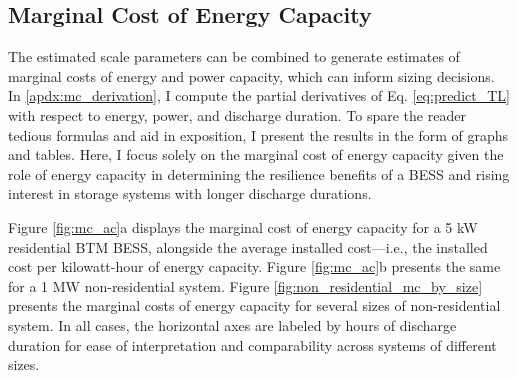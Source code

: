 \documentclass[preprint,12pt,authoryear]{elsarticle}
\begin{document}
\subsection{Marginal Cost of Energy Capacity}\label{sec:mc}

The estimated scale parameters can be combined to generate estimates of marginal costs of energy and power capacity, which can inform sizing decisions. In \ref{apdx:mc_derivation}, I compute the partial derivatives of Eq. \ref{eq:predict_TL} with respect to energy, power, and discharge duration. To spare the reader tedious formulas and aid in exposition, I present the results in the form of graphs and tables. Here, I focus solely on the marginal cost of energy capacity given the role of energy capacity in determining the resilience benefits of a BESS and rising interest in storage systems with longer discharge durations.

Figure \ref{fig:mc_ac}a displays the marginal cost of energy capacity for a 5 kW residential BTM BESS, alongside the average installed cost---i.e., the installed cost per kilowatt-hour of energy capacity. Figure \ref{fig:mc_ac}b  presents the same for a 1 MW non-residential system. Figure \ref{fig:non_residential_mc_by_size} presents the marginal costs of energy capacity for several sizes of non-residential system. In all cases, the horizontal axes are labeled by hours of discharge duration for ease of interpretation and comparability across systems of different sizes.
\end{document}
